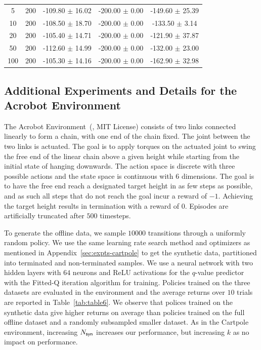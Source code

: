 \begin{table}[h!]
\begin{tabular}{ccccc}
5 & 200 & -109.80 $\pm$ 16.02 & -200.00 $\pm$ 0.00 & -149.60 $\pm$ 25.39 \\ 
10 & 200 & -108.50 $\pm$ 18.70 & -200.00 $\pm$ 0.00 & -133.50 $\pm$ 3.14 \\ 
20 & 200 & -105.40 $\pm$ 14.71 & -200.00 $\pm$ 0.00 & -121.90 $\pm$ 37.87 \\ 
50 & 200 & -112.60 $\pm$ 14.99 & -200.00 $\pm$ 0.00 & -132.00 $\pm$ 23.00 \\ 
100 & 200 & -105.30 $\pm$ 14.16 & -200.00 $\pm$ 0.00 & -162.90 $\pm$ 32.98 \\ \hline
\end{tabular}
\label{tab:table5}
\end{table}

\subsection{Additional Experiments and Details for the Acrobot Environment} \label{sec:expts-acrobot}

The Acrobot Environment~(\cite{NIPS1995_8f1d4362}, \cite{Cartpole} MIT License) consists of two links connected linearly to form a chain, with one end of the chain fixed. The joint between the two links is actuated. The goal is to apply torques on the actuated joint to swing the free end of the linear chain above a given height while starting from the initial state of hanging downwards. The action space is discrete with three possible actions and the state space is continuous with $6$ dimensions. The goal is to have the free end reach a designated target height in as few steps as possible, and as such all steps that do not reach the goal incur a reward of $-1$. Achieving the target height results in termination with a reward of $0$. Episodes are artificially truncated after $500$ timesteps. 

To generate the offline data, we sample $10000$ transitions through a uniformly random policy. We use the same learning rate search method and optimizers as mentioned in Appendix~\ref{sec:expts-cartpole} to get the synthetic data, partitioned into terminated and non-terminated samples. We use a neural network with two hidden layers with $64$ neurons and ReLU activations for the $q$-value predictor with the Fitted-Q iteration algorithm for training. Policies trained on the three datasets are evaluated in the environment and the average returns over $10$ trials are reported in Table~\ref{tab:table6}. We observe that polices trained on the synthetic data give higher returns on average than policies trained on the full offline dataset and a randomly subsampled smaller dataset. As in the Cartpole environment, increasing $N_{\sf syn}$ increases our performance, but increasing $k$ as no impact on performance.

